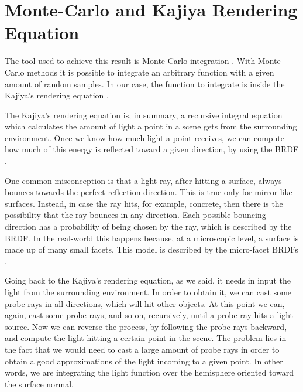 \documentclass{PoliMi_MasterThesis}
\begin{document}
\section*{Monte-Carlo and Kajiya Rendering Equation}
The tool used to achieve this result is Monte-Carlo integration \cite{monte_carlo_integration}. With Monte-Carlo methods it is possible to integrate an arbitrary function with a given amount of random samples. In our case, the function to integrate is inside the Kajiya's rendering equation \cite{rendering_equation}.

The Kajiya's rendering equation is, in summary, a recursive integral equation which calculates the amount of light a point in a scene gets from the surrounding environment. Once we know how much light a point receives, we can compute how much of this energy is reflected toward a given direction, by using the BRDF \cite{brdf}.

One common misconception is that a light ray, after hitting a surface, always bounces towards the perfect reflection direction. This is true only for mirror-like surfaces. Instead, in case the ray hits, for example, concrete, then there is the possibility that the ray bounces in any direction. Each possible bouncing direction has a probability of being chosen by the ray, which is described by the BRDF. In the real-world this happens because, at a microscopic level, a surface is made up of many small facets. This model is described by the micro-facet BRDFs \cite{microfacet_brdf}.

Going back to the Kajiya's rendering equation, as we said, it needs in input the light from the surrounding environment. In order to obtain it, we can cast some probe rays in all directions, which will hit other objects. At this point we can, again, cast some probe rays, and so on, recursively, until a probe ray hits a light source. Now we can reverse the process, by following the probe rays backward, and compute the light hitting a certain point in the scene. The problem lies in the fact that we would need to cast a large amount of probe rays in order to obtain a good approximations of the light incoming to a given point. In other words, we are integrating the light function over the hemisphere oriented toward the surface normal. 
\end{document}
